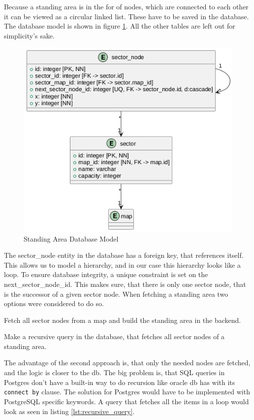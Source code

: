 Because a standing area is in the for of nodes, which are connected to each other it can be viewed as a circular linked list. These have to be saved in the database. The database model is shown in figure \ref{fig:standing_area_db_model}. All the other tables are left out for simplicity's sake.

\begin{figure}
    \centering
    \includegraphics[scale=0.5]{pics/standing-area-db.png}
    \caption{Standing Area Database Model}
    \label{fig:standing_area_db_model}
\end{figure}

The sector\_node entity in the database has a foreign key, that references itself. This allows us to model a hierarchy, and in our case this hierarchy looks like a loop. To ensure database integrity, a unique constraint is set on the next\_sector\_node\_id. This makes sure, that there is only one sector node, that is the successor of a given sector node. When fetching a standing area two options were considered to do so.

\begin{compactenum}
\item Fetch all sector nodes from a map and build the standing area in the backend.
\item Make a recursive query in the database, that fetches all sector nodes of a standing area.
\end{compactenum}

The advantage of the second approach is, that only the needed nodes are fetched, and the logic is closer to the db. The big problem is, that SQL queries in Postgres don't have  a built-in way to do recursion like oracle db has with its \texttt{connect by} clause. The solution for Postgres would have to be implemented with PostgreSQL specific keywords. A query that fetches all the items in a loop would look as seen in listing \ref{lst:recursive_query}. 

